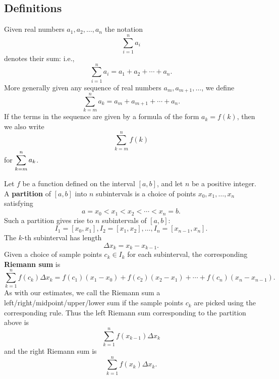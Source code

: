 \thispagestyle{fancy}
\subsection*{Definitions}
\begin{namedtheorem} Given real numbers $a_1, a_2, \dots, a_n$ the notation
  \[
  \sum_{i=1}^{n}a_i
  \]
denotes their sum: i.e.,
\[
\sum_{i=1}^{n}a_i=a_1+a_2+\cdots +a_n.
\]
More generally given any sequence of real numbers $a_{m}, a_{m+1},\dots$, we define
\[
\sum_{k=m}^na_k=a_m+a_{m+1}+\cdots +a_{n}.
\]
If the terms in the sequence are given by a formula of the form $a_k=f(k)$, then we also write
\[
\sum_{k=m}^nf(k)
\]
for $\displaystyle\sum_{k=m}^na_k$.

\end{namedtheorem}
\begin{namedtheorem} Let $f$ be a function defined on the interval $[a,b]$, and let $n$ be a positive integer. A {\bf partition} of $[a,b]$ into $n$ subintervals is a choice of points $x_0, x_1,\dots, x_n$ satisfying
  \[
  a=x_0<x_1<x_2<\cdots <x_n=b.
  \]
Such a partition gives rise to $n$ subintervals of $[a,b]$:
\[
I_1=[x_0, x_1], I_2=[x_1, x_2], \dots , I_n=[x_{n-1}, x_n].
\]
The $k$-th subinterval has length
\[
\Delta x_k=x_{k}-x_{k-1}.
\]
Given a choice of sample points $c_k\in I_k$ for each subinterval, the corresponding {\bf Riemann sum} is
\[
\sum_{k=1}^n f(c_k)\Delta x_k=f(c_1)(x_1-x_0)+f(c_2)(x_2-x_1)+\cdots +f(c_n)(x_n-x_{n-1}).
\]
As with our estimates, we call the Riemann sum a left/right/midpoint/upper/lower sum if the sample points $c_k$ are picked using the corresponding rule. Thus the left Riemann sum corresponding to the partition above is
\[
\sum_{k=1}^nf(x_{k-1})\Delta x_k
\]
and the right Riemann sum is
\[
\sum_{k=1}^nf(x_k)\Delta x_{k}.
\]


\end{namedtheorem}


